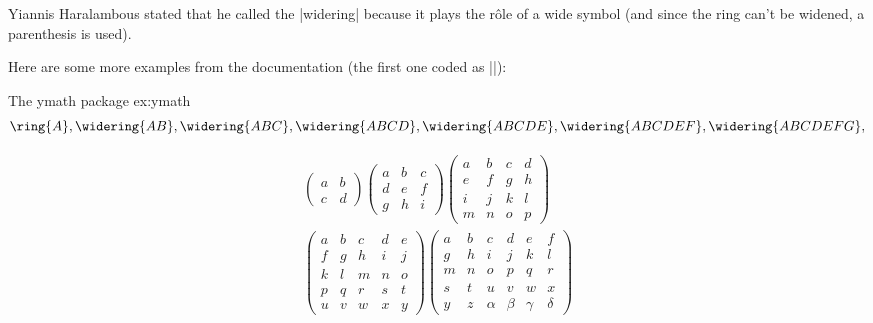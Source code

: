 Yiannis Haralambous stated that he called the |widering| 
because it plays the r\^ole of a wide
 symbol (and since the ring can't be widened, a parenthesis is used).
 
Here are some more examples from the documentation (the first one coded as ||):
 
\begin{texexample}{The ymath package} {ex:ymath}
 $$
 \ring{A},
 \widering{AB},
 \widering{ABC},
 \widering{ABCD},
 \widering{ABCDE},
 \widering{ABCDEF},
 \widering{ABCDEFG},
 $$
\end{texexample} 
 

 \begin{gather}
 \begin{pmatrix} a & b\\ c & d\end{pmatrix}
 \begin{pmatrix} a & b & c\\ d & e & f\\ g & h & i\end{pmatrix}
 \begin{pmatrix} a & b & c & d\\ e & f & g & h\\ i & j & k & l\\
 m & n & o & p\end{pmatrix}
 \\
 \begin{pmatrix} a & b & c & d & e\\ f & g & h & i & j\\
 k & l & m & n & o\\ p & q & r & s & t\\ u & v & w & x & y\end{pmatrix}
 \begin{pmatrix} a & b & c & d & e & f \\ g & h & i & j & k & l \\
 m & n & o & p & q & r \\ s & t & u & v & w & x \\ y & z & \alpha &
 \beta & \gamma & \delta\end{pmatrix}
 \end{gather}


